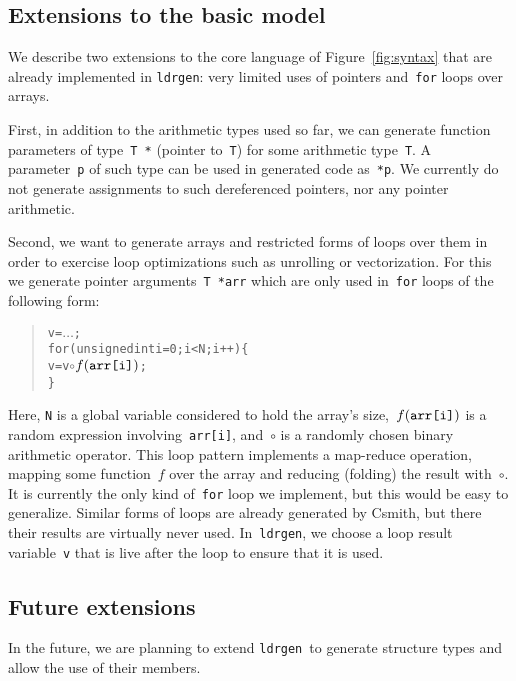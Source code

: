 \documentclass{llncs}
\newcommand\ldrgen{\texttt{ldrgen}}
\begin{document}
\subsection{Extensions to the basic model}

We describe two extensions to the core language of Figure~\ref{fig:syntax}
that are already implemented in \ldrgen: very limited uses of pointers
and~\verb|for| loops over arrays.

First, in addition to the arithmetic types used so far, we can generate
function parameters of type~\verb|T *| (pointer to~\verb|T|) for some
arithmetic type~\verb|T|. A parameter~\verb|p| of such type can be used in
generated code as~\verb|*p|. We currently do not generate assignments to
such dereferenced pointers, nor any pointer arithmetic.

Second, we want to generate arrays and restricted forms of loops over them
in order to exercise loop optimizations such as unrolling or vectorization.
For this we generate pointer arguments~\verb|T *arr| which are only
used in~\verb|for| loops of the following form:

\begin{quote}
\begin{alltt}
v = \(\dots\);
for (unsigned int i = 0; i < N; i++) \{
    v = v \(\circ\) \(f(\mbox{\texttt{arr[i]}})\);
\}
\end{alltt}
\end{quote}

Here, \verb|N| is a global variable considered to hold the array's
size,~\(f(\mbox{\texttt{arr[i]}})\) is a random expression
involving~\verb|arr[i]|, and~\(\circ\) is a randomly chosen binary
arithmetic operator. This loop pattern implements a map-reduce operation,
mapping some function~\(f\) over the array and reducing (folding) the result
with~\(\circ\). It is currently the only kind of~\verb|for| loop we
implement, but this would be easy to generalize.
%
Similar forms of loops are already generated by Csmith, but there their
results are virtually never used. In~\ldrgen, we choose a loop result
variable~\verb|v| that is live after the loop to ensure that it is used.

\subsection{Future extensions}

In the future, we are planning to extend \ldrgen\ to generate structure
types and allow the use of their members.
\end{document}
